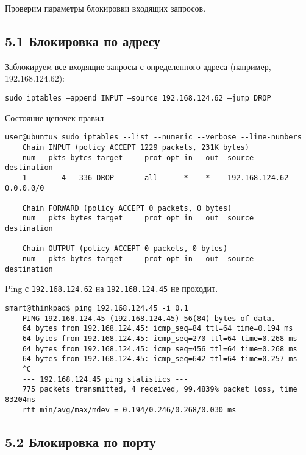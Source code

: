 Проверим параметры блокировки входящих запросов.

\subsection*{5.1 Блокировка по адресу}

Заблокируем все входящие запросы с определенного адреса (например, 192.168.124.62):

\texttt{sudo iptables --append INPUT --source 192.168.124.62 --jump DROP}

Состояние цепочек правил
\begin{Verbatim}[frame=single,breaklines=true,breakanywhere=true]
    user@ubuntu$ sudo iptables --list --numeric --verbose --line-numbers
    Chain INPUT (policy ACCEPT 1229 packets, 231K bytes)
    num   pkts bytes target     prot opt in   out  source           destination
    1        4   336 DROP       all  --  *    *    192.168.124.62   0.0.0.0/0
    
    Chain FORWARD (policy ACCEPT 0 packets, 0 bytes)
    num   pkts bytes target     prot opt in   out  source           destination
    
    Chain OUTPUT (policy ACCEPT 0 packets, 0 bytes)
    num   pkts bytes target     prot opt in   out  source           destination
\end{Verbatim}

Ping с \texttt{192.168.124.62} на \texttt{192.168.124.45} не проходит.
\begin{Verbatim}[frame=single,breaklines=true,breakanywhere=true]
    smart@thinkpad$ ping 192.168.124.45 -i 0.1
    PING 192.168.124.45 (192.168.124.45) 56(84) bytes of data.
    64 bytes from 192.168.124.45: icmp_seq=84 ttl=64 time=0.194 ms
    64 bytes from 192.168.124.45: icmp_seq=270 ttl=64 time=0.268 ms
    64 bytes from 192.168.124.45: icmp_seq=456 ttl=64 time=0.268 ms
    64 bytes from 192.168.124.45: icmp_seq=642 ttl=64 time=0.257 ms
    ^C
    --- 192.168.124.45 ping statistics ---
    775 packets transmitted, 4 received, 99.4839% packet loss, time 83204ms
    rtt min/avg/max/mdev = 0.194/0.246/0.268/0.030 ms
\end{Verbatim}

\subsection*{5.2 Блокировка по порту}

